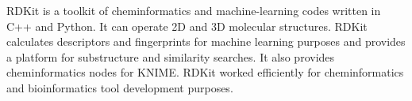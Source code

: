 RDKit is a toolkit of cheminformatics and machine-learning codes written in C++ and Python. It can operate 2D and 3D molecular structures. RDKit calculates descriptors and fingerprints for machine learning purposes and provides a platform for substructure and similarity searches. It also provides cheminformatics nodes for KNIME. RDKit worked efficiently for cheminformatics and bioinformatics tool development purposes.